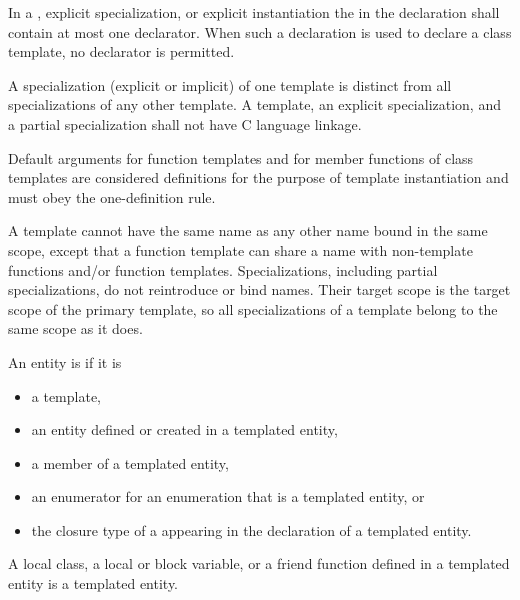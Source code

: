 \pnum
In a
,
explicit specialization, or explicit instantiation the
in the declaration shall contain at most one declarator.
When such a declaration is used to declare a class template,
no declarator is permitted.

\pnum
{}%
A specialization (explicit or implicit) of one template is
distinct from all specializations of any other template.
A template, an explicit specialization, and a
partial specialization shall not have C language linkage.
\begin{note}
Default arguments for function templates and for member functions of
class templates are considered definitions for the purpose of template
instantiation and must obey the one-definition rule.
\end{note}

\pnum
\begin{note}
A template cannot have the same name as any other
name bound in the same scope, except
that a function template can share a name with non-template
functions and/or function templates.
Specializations, including partial specializations,
do not reintroduce or bind names.
Their target scope is the target scope of the primary template,
so all specializations of a template belong to the same scope as it does.
\end{note}

\pnum
{}%
An entity is 
if it is
\begin{itemize}
\item a template,
\item an entity defined or created
      in a templated entity,
\item a member of a templated entity,
\item an enumerator for an enumeration that is a templated entity, or
\item the closure type of a 
      appearing in the declaration of a templated entity.
\end{itemize}

\begin{note}
A local class, a local or block variable, or a friend function defined in a
templated entity is a templated entity.
\end{note}

